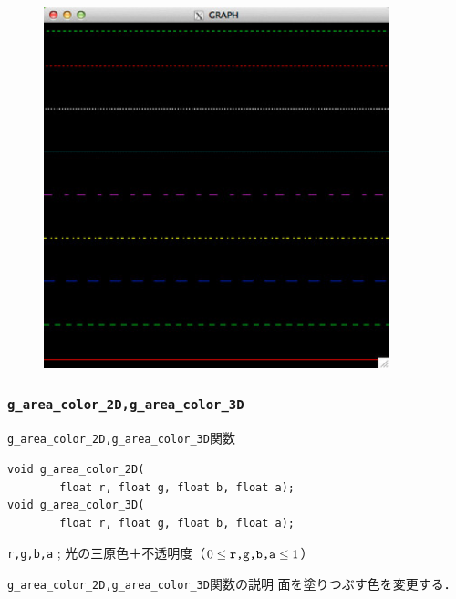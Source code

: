 \documentclass[platex,a4paper,12pt]{jsarticle}%
\begin{document}
\begin{figure}[htb]
	\includegraphics[width=100mm]{./Figures/eps/Canvas_g_line.eps}
\end{figure}





\clearpage
\subsubsection{\texttt{g\_area\_color\_2D,g\_area\_color\_3D}}

\begin{itembox}[l]{\texttt{g\_area\_color\_2D,g\_area\_color\_3D}関数}
\begin{verbatim}
void g_area_color_2D(
        float r, float g, float b, float a);
void g_area_color_3D(
        float r, float g, float b, float a);
\end{verbatim}
\verb|r,g,b,a| ; 光の三原色＋不透明度（$0\leq \verb|r,g,b,a| \leq 1$）\\
\end{itembox}

\begin{itembox}[l]{\texttt{g\_area\_color\_2D,g\_area\_color\_3D}関数の説明}
面を塗りつぶす色を変更する．
\end{itembox}
\end{document}
